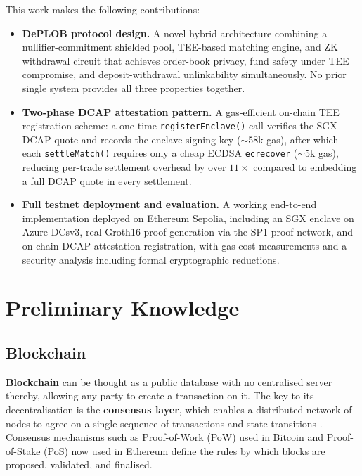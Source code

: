 \documentclass[12pt,a4paper]{article}
\begin{document}
This work makes the following contributions:

\begin{itemize}
    \item \textbf{DePLOB protocol design.} A novel hybrid architecture combining a
    nullifier-commitment shielded pool, TEE-based matching engine, and ZK withdrawal
    circuit that achieves order-book privacy, fund safety under TEE compromise, and
    deposit-withdrawal unlinkability simultaneously. No prior single system provides
    all three properties together.

    \item \textbf{Two-phase DCAP attestation pattern.} A gas-efficient on-chain TEE
    registration scheme: a one-time \texttt{registerEnclave()} call verifies the SGX
    DCAP quote and records the enclave signing key (${\sim}$58k gas), after which each
    \texttt{settleMatch()} requires only a cheap ECDSA \texttt{ecrecover} (${\sim}$5k gas),
    reducing per-trade settlement overhead by over $11\times$ compared to embedding a
    full DCAP quote in every settlement.

    \item \textbf{Full testnet deployment and evaluation.} A working end-to-end
    implementation deployed on Ethereum Sepolia, including an SGX enclave on Azure
    DCsv3, real Groth16 proof generation via the SP1 proof network, and on-chain DCAP
    attestation registration, with gas cost measurements and a security analysis
    including formal cryptographic reductions.
\end{itemize}

\section{Preliminary Knowledge}
\subsection{Blockchain}

\textbf{Blockchain} can be thought as a public database with no centralised server thereby, allowing any party to create a transaction on it. The key to its decentralisation is the \textbf{consensus layer}, which enables a distributed network of nodes to agree on a single sequence of transactions and state transitions \parencite{abraham2017blockchain}. Consensus mechanisms such as Proof-of-Work (PoW) used in Bitcoin \parencite{bitcoin} and Proof-of-Stake (PoS) now used in Ethereum \parencite{ethereum} define the rules by which blocks are proposed, validated, and finalised.
\end{document}
